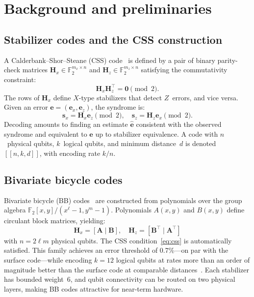 \documentclass[a4paper,twocolumn,11pt,unpublished,nopdfoutputerror]{quantumarticle}
\newcommand{\F}{\mathbb{F}}
\newcommand{\synd}{\mathbf{s}}
\newcommand{\err}{\mathbf{e}}
\newcommand{\ehat}{\hat{\mathbf{e}}}
\newcommand{\Hmat}{\mathbf{H}}
\newcommand{\code}[3]{\ensuremath{[\![#1,#2,#3]\!]}}
\begin{document}
\section{Background and preliminaries}\label{sec:background}

\subsection{Stabilizer codes and the CSS construction}

A Calderbank--Shor--Steane (CSS) code~\cite{Calderbank1996Good,Steane1996Error} is defined by a pair of binary parity-check matrices $\Hmat_x \in \F_2^{m_x \times n}$ and $\Hmat_z \in \F_2^{m_z \times n}$ satisfying the commutativity constraint:
\begin{equation}
\Hmat_x \Hmat_z^\top = \mathbf{0} \pmod{2}.
\label{eq:css}
\end{equation}
The rows of $\Hmat_x$ define $X$-type stabilizers that detect $Z$~errors, and vice versa. Given an error $\err = (\err_x, \err_z)$, the syndrome is:
\begin{equation}
\synd_x = \Hmat_x \err_z \pmod{2}, \quad \synd_z = \Hmat_z \err_x \pmod{2}.
\label{eq:syndrome}
\end{equation}
Decoding amounts to finding an estimate $\ehat$ consistent with the observed syndrome and equivalent to $\err$ up to stabilizer equivalence. A code with $n$~physical qubits, $k$~logical qubits, and minimum distance~$d$ is denoted $\code{n}{k}{d}$, with encoding rate $k/n$.

\subsection{Bivariate bicycle codes}

Bivariate bicycle (BB) codes~\cite{Bravyi2024Memory} are constructed from polynomials over the group algebra $\F_2[x,y]/(x^\ell - 1, y^m - 1)$. Polynomials $A(x,y)$ and $B(x,y)$ define circulant block matrices, yielding:
\begin{equation}
\Hmat_x = [\mathbf{A} \mid \mathbf{B}], \quad \Hmat_z = [\mathbf{B}^\top \mid \mathbf{A}^\top]
\label{eq:bb}
\end{equation}
with $n = 2\ell m$ physical qubits. The CSS condition~\eqref{eq:css} is automatically satisfied. This family achieves an error threshold of 0.7\%---on par with the surface code---while encoding $k = 12$ logical qubits at rates more than an order of magnitude better than the surface code at comparable distances~\cite{Bravyi2024Memory}. Each stabilizer has bounded weight~6, and qubit connectivity can be routed on two physical layers, making BB codes attractive for near-term hardware.
\end{document}
